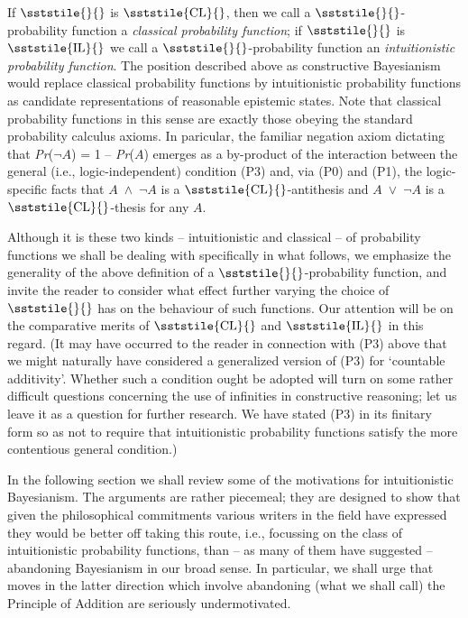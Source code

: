 \noindent If {\small \(\sststile{}{}\)} is {\small \(\sststile{\mathrm{CL}}{}\)}, then we call a {\small \(\sststile{}{}\)}{}-probability function a \textit{classical probability function}; if {\small \(\sststile{}{}\)} is {\small \(\sststile{\mathrm{IL}}{}\)} we call a {\small \(\sststile{}{}\)}{}-probability function an \textit{intuitionistic} \textit{probability function}. The position described above as constructive Bayesianism would replace classical probability functions by intuitionistic probability functions as candidate representations of reasonable epistemic states. Note that classical probability functions in this sense are exactly those obeying the standard probability calculus axioms. In paricular, the familiar negation axiom dictating that \textit{Pr}(${\lnot}$\(A\)) = 1 -- \textit{Pr}(\(A\)) emerges as a by-product of the interaction between the general (i.e., logic-independent) condition (P3) and, via (P0) and (P1), the logic-specific facts that \(A\)~${\wedge}$~${\lnot}$\(A\) is a {\small \(\sststile{\mathrm{CL}}{}\)}{}-antithesis\textit{ }and \(A\)~${\vee}$~${\lnot}$\(A\) is a {\small \(\sststile{\mathrm{CL}}{}\)}{}-thesis for any \(A\).

Although it is these two kinds -- intuitionistic and classical -- of probability functions we shall be dealing with specifically in what follows, we emphasize the generality of the above definition of a {\small \(\sststile{}{}\)}{}-probability function, and invite the reader to consider what effect further varying the choice of {\small \(\sststile{}{}\)} has on the behaviour of such functions. Our attention will be on the comparative merits of {\small \(\sststile{\mathrm{CL}}{}\)} and {\small \(\sststile{\mathrm{IL}}{}\)} in this regard. (It may have occurred to the reader in connection with (P3) above that we might naturally have considered a generalized version of (P3) for `countable additivity'. Whether such a condition ought be adopted will turn on some rather difficult questions concerning the use of infinities in constructive reasoning; let us leave it as a question for further research. We have stated (P3) in its finitary form so as not to require that intuitionistic probability functions satisfy the more contentious general condition.)

In the following section we shall review some of the motivations for intuitionistic Bayesianism. The arguments are rather piecemeal; they are designed to show that given the philosophical commitments various writers in the field have expressed they would be better off taking this route, i.e., focussing on the class of intuitionistic probability functions, than -- as many of them have suggested --abandoning Bayesianism in our broad sense. In particular, we shall urge that moves in the latter direction which involve abandoning (what we shall call) the Principle of Addition are seriously undermotivated. 


